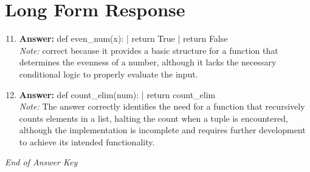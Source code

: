 \documentclass[12pt]{article}
\begin{document}
\section*{Long Form Response}
\begin{enumerate}[label=\arabic*.]
\setcounter{enumi}{10}
\item \textbf{Answer:} def even\_num(x): | return True | return False
\\ \textit{Note:} correct because it provides a basic structure for a function that determines the evenness of a number, although it lacks the necessary conditional logic to properly evaluate the input.
\item \textbf{Answer:} def count\_elim(num): | return count\_elim
\\ \textit{Note:} The answer correctly identifies the need for a function that recursively counts elements in a list, halting the count when a tuple is encountered, although the implementation is incomplete and requires further development to achieve its intended functionality.
\end{enumerate}

\vfill
\noindent\textit{End of Answer Key}
\end{document}
